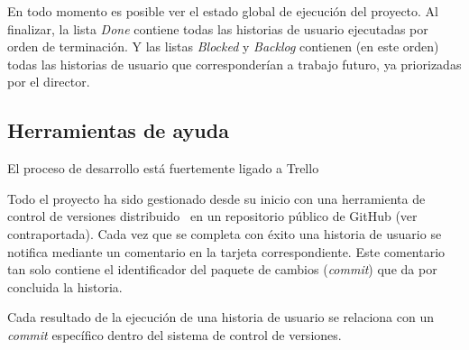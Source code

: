 En todo momento es posible ver el estado global de ejecución del proyecto.  Al finalizar, la lista \emph{Done} contiene todas las historias de usuario ejecutadas por orden de terminación.  Y las listas \emph{Blocked} y \emph{Backlog} contienen (en este orden) todas las historias de usuario que corresponderían a trabajo futuro, ya priorizadas por el director.

\subsection{Herramientas de ayuda}

El proceso de desarrollo está fuertemente ligado a Trello

Todo el proyecto ha sido gestionado desde su inicio con una herramienta de control de versiones distribuido~\cite{scottchaconbenstraub2018} en un repositorio público de GitHub (ver contraportada).  Cada vez que se completa con éxito una historia de usuario se notifica mediante un comentario en la tarjeta correspondiente.  Este comentario tan solo contiene el identificador del paquete de cambios (\emph{commit}) que da por concluida la historia.

Cada resultado de la ejecución de una historia de usuario se relaciona con un \emph{commit} específico dentro del sistema de control de versiones.

